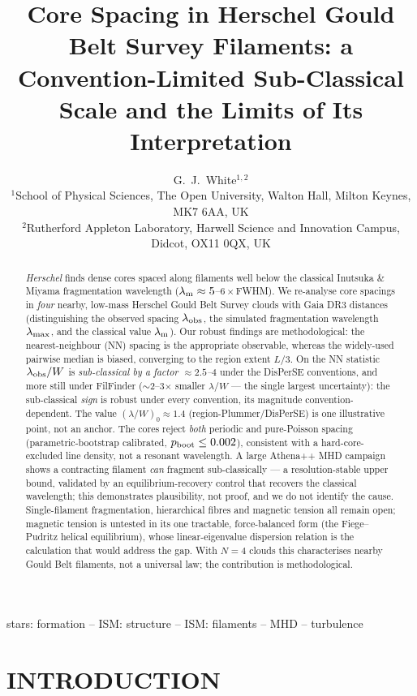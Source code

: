 \documentclass[usenatbib,twoside,twocolumn]{mnras}
\title[Sub-classical core spacing in HGBS filaments]{Core Spacing in Herschel Gould Belt Survey Filaments: a Convention-Limited Sub-Classical Scale and the Limits of Its Interpretation}
\author[G.~J.~White]{G.~J.~White$^{1,2}$\\
$^{1}$School of Physical Sciences, The Open University, Walton Hall, Milton Keynes, MK7 6AA, UK\\
$^{2}$Rutherford Appleton Laboratory, Harwell Science and Innovation Campus, Didcot, OX11 0QX, UK}
\begin{document}
\maketitle

\begin{abstract}
\textit{Herschel} finds dense cores spaced along filaments well below the classical Inutsuka \& Miyama fragmentation wavelength ($\lambda_{\rm m}\approx5$--$6\times$FWHM). We re-analyse core spacings in \emph{four} nearby, low-mass Herschel Gould Belt Survey clouds with Gaia DR3 distances (distinguishing the observed spacing $\lambda_{\rm obs}$, the simulated fragmentation wavelength $\lambda_{\rm max}$, and the classical value $\lambda_{\rm m}$). Our robust findings are methodological: the nearest-neighbour (NN) spacing is the appropriate observable, whereas the widely-used pairwise median is biased, converging to the region extent $L/3$. On the NN statistic $\lambda_{\rm obs}/W$ is \emph{sub-classical by a factor $\approx2.5$--$4$} under the DisPerSE conventions, and more still under FilFinder ($\sim$2--3$\times$ smaller $\lambda/W$ --- the single largest uncertainty): the sub-classical \emph{sign} is robust under every convention, its magnitude convention-dependent. The value $(\lambda/W)_0\approx1.4$ (region-Plummer/DisPerSE) is one illustrative point, not an anchor. The cores reject \emph{both} periodic and pure-Poisson spacing (parametric-bootstrap calibrated, $p_{\rm boot}\leq0.002$), consistent with a hard-core-excluded line density, not a resonant wavelength. A large Athena++ MHD campaign shows a contracting filament \emph{can} fragment sub-classically --- a resolution-stable upper bound, validated by an equilibrium-recovery control that recovers the classical wavelength; this demonstrates plausibility, not proof, and we do not identify the cause. Single-filament fragmentation, hierarchical fibres and magnetic tension all remain open; magnetic tension is untested in its one tractable, force-balanced form (the Fiege--Pudritz helical equilibrium), whose linear-eigenvalue dispersion relation is the calculation that would address the gap. With $N=4$ clouds this characterises nearby Gould Belt filaments, not a universal law; the contribution is methodological.
\end{abstract}


\begin{keywords}
stars: formation -- ISM: structure -- ISM: filaments -- MHD -- turbulence
\end{keywords}

\section{INTRODUCTION}
\end{document}
